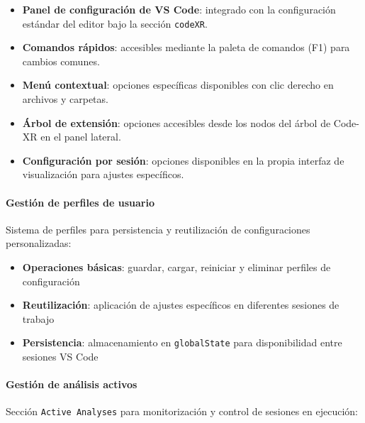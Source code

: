 \documentclass[a4paper, 12pt]{book}
\begin{document}
\begin{itemize}
  \item \textbf{Panel de configuración de VS Code}: integrado con la configuración estándar del editor bajo la sección \texttt{codeXR}.
  
  \item \textbf{Comandos rápidos}: accesibles mediante la paleta de comandos (F1) para cambios comunes.
  
  \item \textbf{Menú contextual}: opciones específicas disponibles con clic derecho en archivos y carpetas.
  
  \item \textbf{Árbol de extensión}: opciones accesibles desde los nodos del árbol de Code-XR en el panel lateral.
  
  \item \textbf{Configuración por sesión}: opciones disponibles en la propia interfaz de visualización para ajustes específicos.
\end{itemize}


\paragraph{Gestión de perfiles de usuario}
Sistema de perfiles para persistencia y reutilización de configuraciones personalizadas:

\begin{itemize}
  \item \textbf{Operaciones básicas}: guardar, cargar, reiniciar y eliminar perfiles de configuración
  \item \textbf{Reutilización}: aplicación de ajustes específicos en diferentes sesiones de trabajo
  \item \textbf{Persistencia}: almacenamiento en \texttt{globalState} para disponibilidad entre sesiones VS Code
\end{itemize}

\paragraph{Gestión de análisis activos}
Sección \texttt{Active Analyses} para monitorización y control de sesiones en ejecución:
\end{document}
